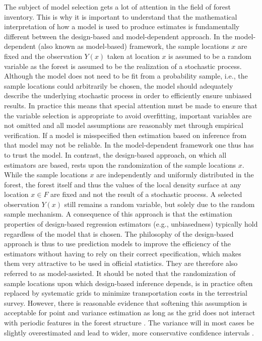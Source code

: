 The subject of model selection gets a lot of attention in the field of forest inventory. This is why it is important to understand that the mathematical interpretation of how a model is used to produce estimates is fundamentally different between the design-based and model-dependent approach. In the model-dependent (also known as model-based) framework, the sample locations $x$ are fixed and the observation $Y(x)$ taken at location $x$ is assumed to be a random variable as the forest is assumed to be the realization of a stochastic process. Although the model does not need to be fit from a probability sample, i.e., the sample locations could arbitrarily be chosen, the model should adequately describe the underlying stochastic process in order to efficiently ensure unbiased results. In practice this means that special attention must be made to ensure that the variable selection is appropriate to avoid overfitting, important variables are not omitted and all model assumptions are reasonably met through empirical verification. If a model is misspecified then estimation based on inference from that model may not be reliable. In the model-dependent framework one thus has to trust the model. In contrast, the design-based approach, on which all  estimators are based, rests upon the randomization of the sample locations $x$. While the sample locations $x$ are independently and uniformly distributed in the forest, the forest itself and thus the values of the local density surface at any location $x \in F$ are fixed and not the result of a stochastic process. A selected observation $Y(x)$ still remains a random variable, but solely due to the random sample mechanism. A consequence of this approach is that the estimation properties of design-based regression estimators (e.g., unbiasedness) typically hold regardless of the model that is chosen. The philosophy of the design-based approach is thus to use prediction models to improve the efficiency of the estimators without having to rely on their correct specification, which makes them very attractive to be used in official statistics. They are therefore also referred to as model-assisted. It should be noted that the randomization of sample locations upon which design-based inference depends, is in practice often replaced by systematic grids to minimize transportation costs in the terrestrial survey. However, there is reasonable evidence that softening this assumption is acceptable for point and variance estimation as long as the grid does not interact with periodic features in the forest structure \citep{mandallaz2008}. The variance will in most cases be slightly overestimated and lead to wider, more conservative confidence intervals \citep{mandallaz2013a}.

